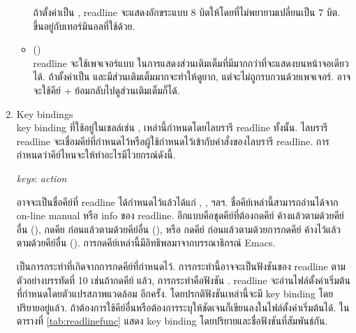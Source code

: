 \begin{thwbr}
\begin{enumerate}
\begin{itemize}
ถ้าตั้งค่าเป็น , readline จะแสดงอักขระแบบ 8 บิตให้โดยที่ไม่พยายามเปลี่ยนเป็น 7 บิต. ขึ้นอยู่กับเทอร์มินอลที่ใช้ด้วย.
\item {} ()\\
readline จะใช้เพจเจอร์แบบ  ในการแสดงส่วนเติมเต็มที่มีมากกว่าที่จะแสดงบนหน้าจอเดียวได้. ถ้าตั้งค่าเป็น  และมีส่วนเติมเต็มมากจะทำให้ดูยาก, แต่จะไม่ถูกรบกวนด้วยเพจเจอร์. อาจจะใช้คีย์ + ย้อมกลับไปดูส่วนเติมเต็มก็ได้.
\end{itemize}
\item Key bindings\\
key binding ที่ใช้อยู่ในเชลล์เช่น ,  เหล่านี้กำหนดโดยไลบรารี readline ทั้งนั้น. ไลบรารี readline จะเชื่อมคีย์ที่กำหนดไว้หรือผู้ใช้กำหนดไว้เข้ากับคำสั่งของไลบรารี readline. การกำหนดว่าคีย์ไหนจะให้ทำอะไรมีไวยกรณ์ดังนี้.
\begin{MyVerbatim}
\textit{keys}: \textit{action}
\end{MyVerbatim}

 อาจจะเป็นชื่อคีย์ที่ readline ได้กำหนดไว้แล้วได้แก่ , ,  ฯลฯ. ชื่อคีย์เหล่านี้สามารถอ่านได้จาก on-line manual หรือ info ของ readline.  อีกแบบคือชุดคีย์ที่ต้องกดคีย์  ค้างแล้วตามด้วยคีย์อื่น (), กดคีย  ก่อนแล้วตามด้วยคีย์อื่น (), หรือ กดคีย์  ก่อนแล้วตามด้วยการกดคีย์  ค้างไว้แล้วตามด้วยคีย์อื่น (). การกดคีย์เหล่านี้มีอิทธิพลมาจากบรรณาธิกรณ์ Emacs. 

 เป็นการกระทำที่เกิดจากการกดคีย์ที่กำหนดไว้. การกระทำนี้อาจจะเป็นฟังชันของ readline ตามตัวอย่างบรรทัดที่ 10 เช่นถ้ากดคีย์  แล้ว, การกระทำคือฟังชัน . readline จะอ่านไฟล์ตั้งค่าเริ่มต้นที่กำหนดโดยตัวแปรสภาพแวดล้อม  อีกครั้ง. โดยปรกติฟังชันเหล่านี้จะมี key binding โดยปริยายอยู่แล้ว. ถ้าต้องการใช้คีย์อื่นหรือต้องการระบุให้ชัดเจนก็เขียนลงในไฟล์ตั้งค่าเริ่มต้นได้. ในตารางที่ \ref{tab:readlinefunc} แสดง key binding โดยปริยายและชื่อฟังชันที่สัมพันธ์กัน.


\end{enumerate}
\end{thwbr}
